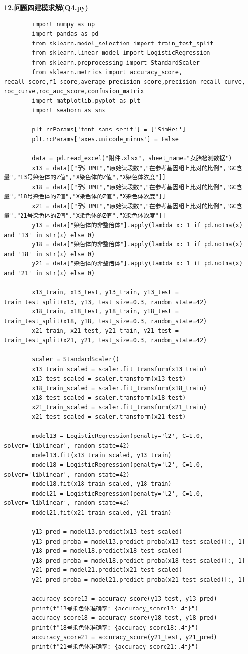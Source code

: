 \documentclass[12pt]{ctexart}
\begin{document}
		\noindent \textbf{\heiti 12.问题四建模求解(Q4.py)}
	\begin{verbatim}
		import numpy as np
		import pandas as pd
		from sklearn.model_selection import train_test_split
		from sklearn.linear_model import LogisticRegression
		from sklearn.preprocessing import StandardScaler
		from sklearn.metrics import accuracy_score, recall_score,f1_score,average_precision_score,precision_recall_curve, roc_curve,roc_auc_score,confusion_matrix
		import matplotlib.pyplot as plt
		import seaborn as sns
		
		plt.rcParams['font.sans-serif'] = ['SimHei']  
		plt.rcParams['axes.unicode_minus'] = False
		
		data = pd.read_excel("附件.xlsx", sheet_name="女胎检测数据")
		x13 = data[["孕妇BMI","原始读段数","在参考基因组上比对的比例","GC含量","13号染色体的Z值","X染色体的Z值","X染色体浓度"]]
		x18 = data[["孕妇BMI","原始读段数","在参考基因组上比对的比例","GC含量","18号染色体的Z值","X染色体的Z值","X染色体浓度"]]
		x21 = data[["孕妇BMI","原始读段数","在参考基因组上比对的比例","GC含量","21号染色体的Z值","X染色体的Z值","X染色体浓度"]]
		y13 = data["染色体的非整倍体"].apply(lambda x: 1 if pd.notna(x) and '13' in str(x) else 0)
		y18 = data["染色体的非整倍体"].apply(lambda x: 1 if pd.notna(x) and '18' in str(x) else 0)
		y21 = data["染色体的非整倍体"].apply(lambda x: 1 if pd.notna(x) and '21' in str(x) else 0)
		
		x13_train, x13_test, y13_train, y13_test = train_test_split(x13, y13, test_size=0.3, random_state=42)
		x18_train, x18_test, y18_train, y18_test = train_test_split(x18, y18, test_size=0.3, random_state=42)
		x21_train, x21_test, y21_train, y21_test = train_test_split(x21, y21, test_size=0.3, random_state=42)
		
		scaler = StandardScaler()
		x13_train_scaled = scaler.fit_transform(x13_train)
		x13_test_scaled = scaler.transform(x13_test)
		x18_train_scaled = scaler.fit_transform(x18_train)
		x18_test_scaled = scaler.transform(x18_test)
		x21_train_scaled = scaler.fit_transform(x21_train)
		x21_test_scaled = scaler.transform(x21_test)
		
		model13 = LogisticRegression(penalty='l2', C=1.0, solver='liblinear', random_state=42)
		model13.fit(x13_train_scaled, y13_train)
		model18 = LogisticRegression(penalty='l2', C=1.0, solver='liblinear', random_state=42)
		model18.fit(x18_train_scaled, y18_train)
		model21 = LogisticRegression(penalty='l2', C=1.0, solver='liblinear', random_state=42)
		model21.fit(x21_train_scaled, y21_train)
		
		y13_pred = model13.predict(x13_test_scaled)
		y13_pred_proba = model13.predict_proba(x13_test_scaled)[:, 1]
		y18_pred = model18.predict(x18_test_scaled)
		y18_pred_proba = model18.predict_proba(x18_test_scaled)[:, 1]
		y21_pred = model21.predict(x21_test_scaled)
		y21_pred_proba = model21.predict_proba(x21_test_scaled)[:, 1]
		
		accuracy_score13 = accuracy_score(y13_test, y13_pred)
		print(f"13号染色体准确率: {accuracy_score13:.4f}")
		accuracy_score18 = accuracy_score(y18_test, y18_pred)
		print(f"18号染色体准确率: {accuracy_score18:.4f}")
		accuracy_score21 = accuracy_score(y21_test, y21_pred)
		print(f"21号染色体准确率: {accuracy_score21:.4f}")
	\end{verbatim}
	
\end{document}
